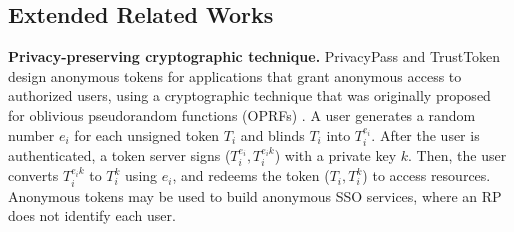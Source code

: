 \subsection{Extended Related Works}
\label{sec:related}

%

\newc
\noindent\textbf{Privacy-preserving cryptographic technique.}
PrivacyPass and TrustToken \cite{privacypass,trusttoken} design anonymous tokens for applications that grant anonymous access to authorized users, using a cryptographic technique that was originally proposed for oblivious pseudorandom functions (OPRFs) \cite{oprf-proved,voprf-proved}.
A user generates a random number $e_i$ for each unsigned token $T_i$ and blinds $T_i$ into $T_i^{e_i}$. After the user is authenticated, a token server signs ($T_i^{e_i}, T_i^{e_i k}$) with a private key $k$. Then, the user converts $T_i^{e_i k}$ to $T_i^k$ using $e_i$, and redeems the token ($T_i, T_i^k$) to access resources.
Anonymous tokens may be used to build anonymous SSO services, where an RP does not identify each user.
